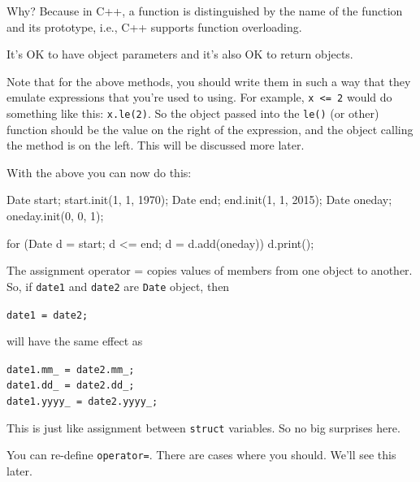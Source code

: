 Why? Because in C++, a function is distinguished by the name of the
function and its prototype, i.e., C++ supports function overloading.


\newpage{}

It's OK to have object parameters and
it's also OK to return objects.





Note that for the above methods, you should write them in such a way
that they emulate expressions that you're used to using. For example, \texttt{x
<= 2} would do something like this: \texttt{x.le(2)}. So the object passed into
the \texttt{le()} (or other) function should be the value on the right of the
expression, and the object calling the method is on the left. This will be
discussed more later.

With the above you can now do this:

\begin{consolethree}[escapeinside=||]
Date start;
start.init(1, 1, 1970);
Date end;
end.init(1, 1, 2015);
Date oneday;
oneday.init(0, 0, 1);

for (Date d = start; d <= end; d = d.add(oneday))
{
    d.print();
}
\end{consolethree}


\newpage{}

The assignment operator = copies values of members from one object to
another. So, if \texttt{date1} and \texttt{date2} are \texttt{Date} object,
then

\texttt{date1 = date2;}

will have the same effect as
\begin{center}
\texttt{date1.mm\_ = date2.mm\_;}\\

\texttt{date1.dd\_ = date2.dd\_;}\\

\texttt{date1.yyyy\_ = date2.yyyy\_;}\\
\end{center}

This is just like assignment between \texttt{struct} variables. So no big
surprises here.

You can re-define \texttt{operator=}. There are cases where you should.
We'll see this later.


